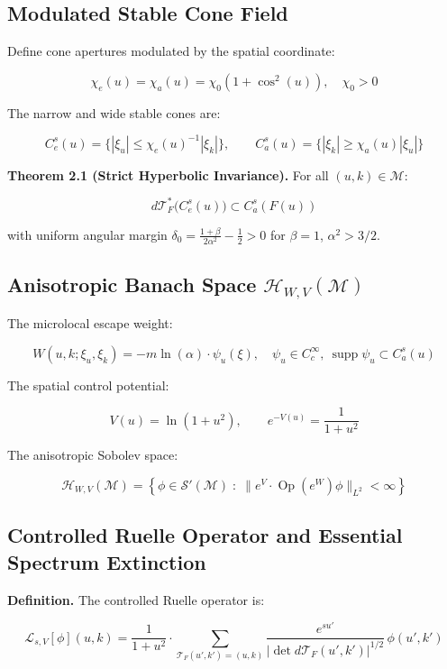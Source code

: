 \subsection{Modulated Stable Cone Field}

Define cone apertures modulated by the spatial coordinate:

\[
\chi_e(u) = \chi_a(u) = \chi_0(1 + \cos^2(u)), \quad \chi_0 > 0
\]

The narrow and wide stable cones are:

\[
C^s_e(u) = \{ |\xi_u| \le \chi_e(u)^{-1}|\xi_k| \}, \qquad
C^s_a(u) = \{ |\xi_k| \ge \chi_a(u)|\xi_u| \}
\]

\textbf{Theorem 2.1 (Strict Hyperbolic Invariance).} For all $(u,k) \in \mathcal{M}$:

\[
d\mathcal{T}_F^*\bigl(C^s_e(u)\bigr) \subset C^s_a(F(u))
\]

with uniform angular margin $\delta_0 = \frac{1+\beta}{2\alpha^2} - \frac{1}{2} > 0$ for $\beta = 1$, $\alpha^2 > 3/2$.

\subsection{Anisotropic Banach Space $\mathcal{H}_{W,V}(\mathcal{M})$}

The microlocal escape weight:

\[
W(u, k; \xi_u, \xi_k) = -m\ln(\alpha) \cdot \psi_u(\xi), \quad \psi_u \in C_c^\infty,\ \operatorname{supp}\psi_u \subset C^s_a(u)
\]

The spatial control potential:

\[
V(u) = \ln(1 + u^2), \qquad e^{-V(u)} = \frac{1}{1+u^2}
\]

The anisotropic Sobolev space:

\[
\mathcal{H}_{W,V}(\mathcal{M}) = \left\{ \phi \in \mathcal{S}'(\mathcal{M}) \;:\; \| e^{V} \cdot \operatorname{Op}(e^W)\phi \|_{L^2} < \infty \right\}
\]

\subsection{Controlled Ruelle Operator and Essential Spectrum Extinction}

\textbf{Definition.} The controlled Ruelle operator is:

\[
\mathcal{L}_{s,V}[\phi](u, k) = \frac{1}{1+u^2} \cdot \sum_{\mathcal{T}_F(u',k') = (u,k)} 
\frac{e^{s u'}}{| \det d\mathcal{T}_F(u',k') |^{1/2}} \, \phi(u',k')
\]


